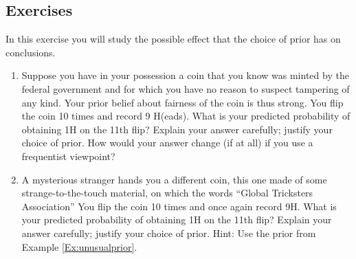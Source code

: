 \subsection*{Exercises} 
\begin{Exercise} \label{ex3.5.1}  In this exercise you will study the possible effect that the choice of prior has on conclusions.
\begin{enumerate}[noitemsep,label=(\alph*)]
	\item Suppose you have in your possession a coin that you know was minted by the federal government and for which you have no reason to suspect tampering of any kind. Your prior belief about fairness of the coin is thus strong. You flip the coin 10 times and record 9 H(eads). What is your predicted probability of obtaining 1H on the 11th flip? Explain your answer carefully; justify your choice of prior. How would your answer change (if at all) if you use a frequentist viewpoint? 
	\item A mysterious stranger hands you a different coin, this one made of some strange-to-the-touch material, on which the words ``Global Tricksters Association'' You flip the coin 10 times and once again record 9H. What is your predicted probability of obtaining 1H on the 11th flip? Explain your answer carefully; justify your choice of prior.  Hint: Use the prior from Example \ref{Ex:unusualprior}.
\end{enumerate}
\end{Exercise}

